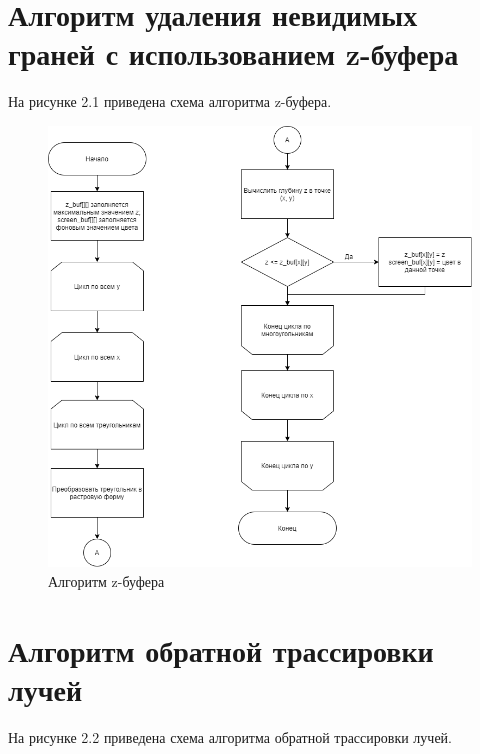 \documentclass[12pt,a4paper,oneside]{report}
\begin{document}
	\newpage
	\section{Алгоритм удаления невидимых граней с использованием z-буфера}
	
	\quad На рисунке 2.1 приведена схема алгоритма z-буфера. 
	
	\begin{figure}[H]
		\centering
		\includegraphics[scale=0.6]{z_buffer}
		\caption{Алгоритм z-буфера}
		\label{fig:z}
	\end{figure}

	\section{Алгоритм обратной трассировки лучей}
	
	\quad На рисунке 2.2 приведена схема алгоритма обратной трассировки лучей. 
	
\end{document}
